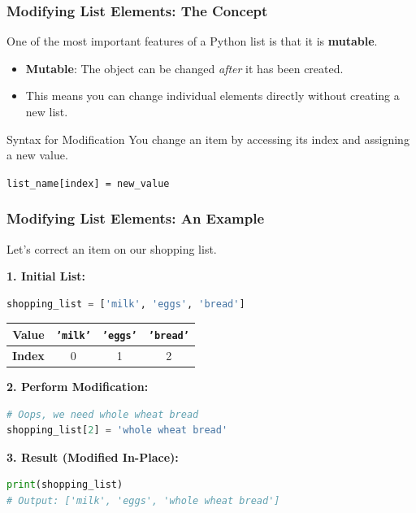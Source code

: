 \documentclass{beamer}
\begin{document}
\begin{frame}[fragile]
    \frametitle{Modifying List Elements: The Concept}
    
    One of the most important features of a Python list is that it is \textbf{mutable}.
    
    \begin{itemize}
        \item \textbf{Mutable}: The object can be changed \textit{after} it has been created.
        \item This means you can change individual elements directly without creating a new list.
    \end{itemize}
    
    \vfill
    
    \begin{block}{Syntax for Modification}
        You change an item by accessing its index and assigning a new value.
        \begin{center}
            \texttt{list\_name[index] = new\_value}
        \end{center}
    \end{block}
    
\end{frame}

\begin{frame}[fragile]
    \frametitle{Modifying List Elements: An Example}
    
    Let's correct an item on our shopping list.
    
    \textbf{1. Initial List:}
    \begin{lstlisting}[language=Python]
shopping_list = ['milk', 'eggs', 'bread']
    \end{lstlisting}
    
    \begin{center}
    \begin{tabular}{|c|c|c|c|}
        \hline
        \textbf{Value} & \texttt{'milk'} & \texttt{'eggs'} & \texttt{'bread'} \\
        \hline
        \textbf{Index} & 0 & 1 & 2 \\
        \hline
    \end{tabular}
    \end{center}
    
    \pause
    
    \vfill
    
    \textbf{2. Perform Modification:}
    \begin{lstlisting}[language=Python]
# Oops, we need whole wheat bread
shopping_list[2] = 'whole wheat bread'
    \end{lstlisting}
    
    \pause
    
    \textbf{3. Result (Modified In-Place):}
    \begin{lstlisting}[language=Python]
print(shopping_list)
# Output: ['milk', 'eggs', 'whole wheat bread']
    \end{lstlisting}
    
\end{frame}
\end{document}
